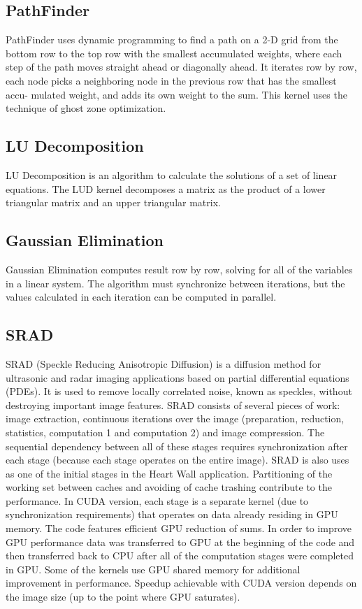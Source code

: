 \documentclass[paper=a4, fontsize=11pt]{scrartcl}
\numberwithin{equation}{section}		%
\numberwithin{figure}{section}			%
\numberwithin{table}{section}				%
\begin{document}
\subsection{PathFinder}
PathFinder uses dynamic programming to find a path on a 2-D grid from the bottom row to the top row with the smallest accumulated weights, where each step of the path moves straight ahead or diagonally ahead. It iterates row by row, each node picks a neighboring node in the previous row that has the smallest accu- mulated weight, and adds its own weight to the sum.
This kernel uses the technique of ghost zone optimization.

\subsection{LU Decomposition}
LU Decomposition is an algorithm to calculate the solutions of a set of linear equations. The LUD kernel decomposes a matrix as the product of a lower triangular matrix and an upper triangular matrix.

\subsection{Gaussian Elimination}
Gaussian Elimination computes result row by row, solving for all of the variables in a linear system. The algorithm must synchronize between iterations, but the values calculated in each iteration can be computed in parallel.

\subsection{SRAD}
SRAD (Speckle Reducing Anisotropic Diffusion) is a diffusion method for ultrasonic and radar imaging applications based on partial differential equations (PDEs). It is used to remove locally correlated noise, known as speckles, without destroying important image features. SRAD consists of several pieces of work: image extraction, continuous iterations over the image (preparation, reduction, statistics, computation 1 and computation 2) and image compression. The sequential dependency between all of these stages requires synchronization after each stage (because each stage operates on the entire image). SRAD is also uses as one of the initial stages in the Heart Wall application.
Partitioning of the working set between caches and avoiding of cache trashing contribute to the performance. In CUDA version, each stage is a separate kernel (due to synchronization requirements) that operates on data already residing in GPU memory. The code features efficient GPU reduction of sums. In order to improve GPU performance data was transferred to GPU at the beginning of the code and then transferred back to CPU after all of the computation stages were completed in GPU. Some of the kernels use GPU shared memory for additional improvement in performance. Speedup achievable with CUDA version depends on the image size (up to the point where GPU saturates).
\newpage
\end{document}

